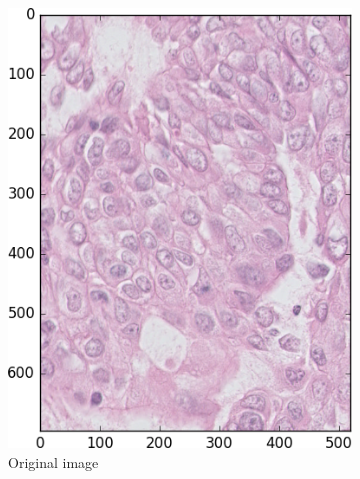 \documentclass[a4paper,10pt]{article}
\begin{document}
\begin{figure}
\begin{multicols}{3}
	\begin{subfigure}{0.33\textwidth}
    \includegraphics[width=\linewidth]{BIS.png}\par 
     \caption{Original image}
     \label{fig:original}
	\end{subfigure}%
	\begin{subfigure}{0.33\textwidth}

\end{subfigure}
\end{multicols}
\end{figure}
\end{document}
